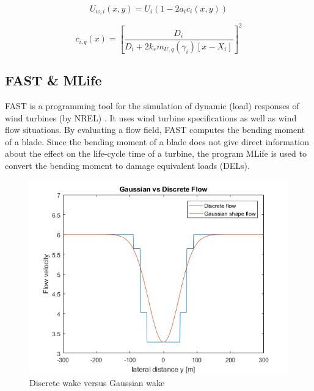\begin{equation}
\label{eq:Uw}
U_{w,i}(x,y) = U_i\left( {1-2a_ic_i(x,y)} \right)
\end{equation} 

\begin{equation}
\label{eq:c}
c_{i,q}(x) = \left[ \frac{D_i}{D_i + 2k_em_{U,q}(\gamma_i)[x - X_i]} \right]^2
\end{equation}




\subsection{FAST \& MLife} FAST is a programming tool for the simulation of dynamic (load) responses of wind turbines (by NREL) \cite{Jonkman2005}. It uses wind turbine specifications as well as wind flow situations. By evaluating a flow field, FAST computes the bending moment of a blade. Since the bending moment of a blade does not give direct information about the effect on the life-cycle time of a turbine, the program MLife is used to convert the bending moment to damage equivalent loads (DELs). 

\begin{figure}
  \includegraphics[width=\linewidth]{./Figures/PlotGausDiscWakeDWake180U6yaw0.png} %
  \caption{Discrete wake versus Gaussian wake} %
  \label{fig:disgaus}
\end{figure}

